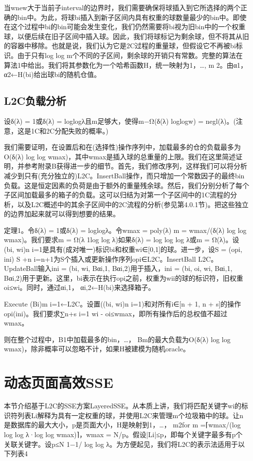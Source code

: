 \documentclass[UTF8]{article}
\begin{document}
当wnew大于当前子interval的边界时，我们需要确保将球插入到它所选择的两个正确的bin中。为此，将球bi插入到新子区间内具有权重的球数量最少的bin中。即使在这个过程中bi的bin可能会发生变化，我们仍然需要将bi视为旧bin中的一个权重球，以便后续在旧子区间中插入球。因此，我们将球标记为剩余球，但不将其从旧的容器中移除。也就是说，我们认为它是2C过程的重量球，但假设它不再被bi标识。由于只有log log m个不同的子区间，剩余球的开销只有常数。完整的算法在算法1中给出。我们将其参数化为一个哈希函数H，统一映射为{1，…, m} 2。由α1， α2←H(bi)给出球bi的随机仓值。

\subsection{L2C负载分析}
设δ(λ) = 1或δ(λ) = loglogλ且m足够大，使得m−Ω(δ(λ) loglogw) = negl(λ)。(注意，这是1C和2C分配失败的概率。)

我们需要证明，在设置后和在(选择性)操作序列中，加载最多的仓的负载最多为O(δ(λ) log log wmax)，其中wmax是插入球的总重量的上限。我们在这里简述证明，并参考附录B获得进一步的细节。首先，我们修改序列，这样我们可以将分析减少到只有(充分独立的)L2C。InsertBall操作，而只增加一个常数因子的最终bin负载。这是恒定因素的负荷是由于额外的重量残余球。然后，我们分别分析了每个子区间加载最多的箱子的负载。这可以归结为对第一个子区间中的1C流程的分析，以及L2C概述中的其余子区间中的2C流程的分析(参见第4.0.1节)。把这些独立的边界加起来就可以得到想要的结果。

定理1。令δ(λ) = 1或δ(λ) = loglogλ。令wmax = poly(λ) m = wmax/(δ(λ) log log wmax)。我们要求m = Ω(λ 1log log λ)如果δ(λ) = log log log λ或m = Ω(λ)。设{(bi, wi)n i=1}是具有(成对唯一)标识bi和权重wi∈[0,1]的球。进一步，设S = (opi, ini) S +n i=n+1为S个插入或更新操作序列opi∈{L2C。InsertBall L2C。UpdateBall}输入ini = (bi, wi, Bαi,1, Bαi,2)用于插入，ini = (bi, oi, wi, Bαi,1, Bαi,2)用于更新。这里，bi表示在执行opi之前，权重为wii的球的标识符，旧权重oi≤wi。同时，通过αi,1， αi,2←H(bi)来选择箱子。

Execute (Bi)m i=1←L2C。设置({(bi, wi)n i=1})和对所有i∈[n + 1, n + s]的操作opi(ini)。我们要求∑n+s i=1 wi - oi≤wmax，即所有操作后的总权值不超过wmax。

则在整个过程中，B1中加载最多的bin，…， Bm的最大负载为O(δ(λ) log log wmax)，除非概率可以忽略不计，如果H被建模为随机oracle。
\section{动态页面高效SSE}
本节介绍基于L2C的SSE方案LayeredSSE。从本质上讲，我们将匹配关键字wi的标识符列表Li解释为具有一定权重的球，并使用L2C来管理m个垃圾箱中的球。让n是数据库的最大大小，p是页面大小，H是映射到{1，…， m}2for m =⌈wmax/(log log log λ·log log wmax)⌉，wmax = N/p。假设|Li|≤p，即每个关键字最多有p个关联关键字。设p≤N 1−1/ log log λ。为方便起见，我们将L2C的表示法适用于以下列表4
\end{document}
